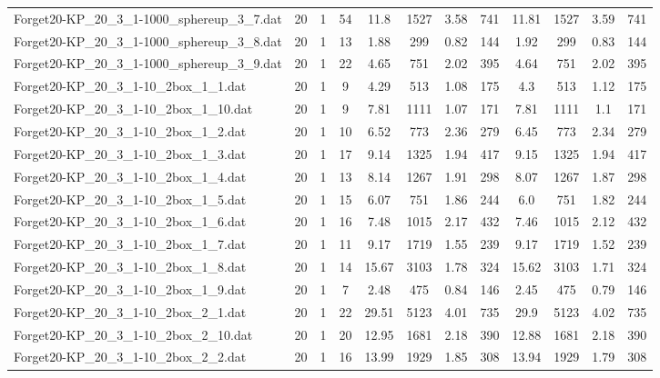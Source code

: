 \begin{sidewaystable}[!ht]
{\begin{tabular}{lccccccccccc}
Forget20-KP\_20\_3\_1-1000\_sphereup\_3\_7.dat & 20 & 1 & 54 & 11.8 & 1527 &  \textcolor{blue2}{3.58} & 741 & 11.81 & 1527 & 3.59 & 741 \\
Forget20-KP\_20\_3\_1-1000\_sphereup\_3\_8.dat & 20 & 1 & 13 & 1.88 & 299 &  \textcolor{blue2}{0.82} & 144 & 1.92 & 299 & 0.83 & 144 \\
Forget20-KP\_20\_3\_1-1000\_sphereup\_3\_9.dat & 20 & 1 & 22 & 4.65 & 751 & 2.02 & 395 & 4.64 & 751 & 2.02 & 395 \\
Forget20-KP\_20\_3\_1-10\_2box\_1\_1.dat & 20 & 1 & 9 & 4.29 & 513 & 1.08 & 175 & 4.3 & 513 & 1.12 & 175 \\
Forget20-KP\_20\_3\_1-10\_2box\_1\_10.dat & 20 & 1 & 9 & 7.81 & 1111 &  \textcolor{blue2}{1.07} & 171 & 7.81 & 1111 & 1.1 & 171 \\
Forget20-KP\_20\_3\_1-10\_2box\_1\_2.dat & 20 & 1 & 10 & 6.52 & 773 & 2.36 & 279 & 6.45 & 773 &  \textcolor{blue2}{2.34} & 279 \\
Forget20-KP\_20\_3\_1-10\_2box\_1\_3.dat & 20 & 1 & 17 & 9.14 & 1325 &  \textcolor{blue2}{1.94} & 417 & 9.15 & 1325 &  \textcolor{blue2}{1.94} & 417 \\
Forget20-KP\_20\_3\_1-10\_2box\_1\_4.dat & 20 & 1 & 13 & 8.14 & 1267 & 1.91 & 298 & 8.07 & 1267 &  \textcolor{blue2}{1.87} & 298 \\
Forget20-KP\_20\_3\_1-10\_2box\_1\_5.dat & 20 & 1 & 15 & 6.07 & 751 & 1.86 & 244 & 6.0 & 751 &  \textcolor{blue2}{1.82} & 244 \\
Forget20-KP\_20\_3\_1-10\_2box\_1\_6.dat & 20 & 1 & 16 & 7.48 & 1015 & 2.17 & 432 & 7.46 & 1015 &  \textcolor{blue2}{2.12} & 432 \\
Forget20-KP\_20\_3\_1-10\_2box\_1\_7.dat & 20 & 1 & 11 & 9.17 & 1719 & 1.55 & 239 & 9.17 & 1719 & 1.52 & 239 \\
Forget20-KP\_20\_3\_1-10\_2box\_1\_8.dat & 20 & 1 & 14 & 15.67 & 3103 & 1.78 & 324 & 15.62 & 3103 &  \textcolor{blue2}{1.71} & 324 \\
Forget20-KP\_20\_3\_1-10\_2box\_1\_9.dat & 20 & 1 & 7 & 2.48 & 475 & 0.84 & 146 & 2.45 & 475 &  \textcolor{blue2}{0.79} & 146 \\
Forget20-KP\_20\_3\_1-10\_2box\_2\_1.dat & 20 & 1 & 22 & 29.51 & 5123 &  \textcolor{blue2}{4.01} & 735 & 29.9 & 5123 & 4.02 & 735 \\
Forget20-KP\_20\_3\_1-10\_2box\_2\_10.dat & 20 & 1 & 20 & 12.95 & 1681 &  \textcolor{blue2}{2.18} & 390 & 12.88 & 1681 &  \textcolor{blue2}{2.18} & 390 \\
Forget20-KP\_20\_3\_1-10\_2box\_2\_2.dat & 20 & 1 & 16 & 13.99 & 1929 & 1.85 & 308 & 13.94 & 1929 &  \textcolor{blue2}{1.79} & 308 \\

\end{tabular}}
\end{sidewaystable}
